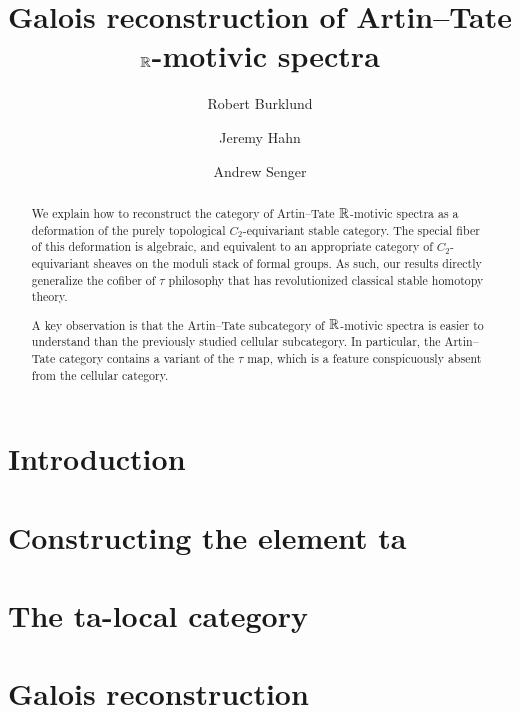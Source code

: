 \documentclass[reqno]{amsart}
\title{Galois reconstruction of Artin--Tate $\mathbb{R}$-motivic spectra}
\author{Robert Burklund}
\author{Jeremy Hahn}
\author{Andrew Senger}
\begin{document}
\begin{abstract}
We explain how to reconstruct the category of Artin--Tate $\mathbb{R}$-motivic spectra as a deformation of the purely topological $C_2$-equivariant stable category.
The special fiber of this deformation is algebraic,
and equivalent to an appropriate category of $C_2$-equivariant sheaves on the moduli stack of formal groups.
As such, our results directly generalize the cofiber of $\tau$ philosophy that has revolutionized classical stable homotopy theory.

A key observation is that the Artin--Tate subcategory of $\mathbb{R}$-motivic spectra is easier to understand than the previously studied cellular subcategory.
In particular, the Artin--Tate category contains a variant of the $\tau$ map, which is a feature conspicuously absent from the cellular category.

\end{abstract}
\maketitle

\setcounter{tocdepth}{1}
\tableofcontents
{}


\section{Introduction} \label{sec:intro}


\section{Constructing the element ta} \label{sec:ta}


\section{The ta-local category} \label{sec:homology}


\section{Galois reconstruction} \label{sec:top}

\end{document}
